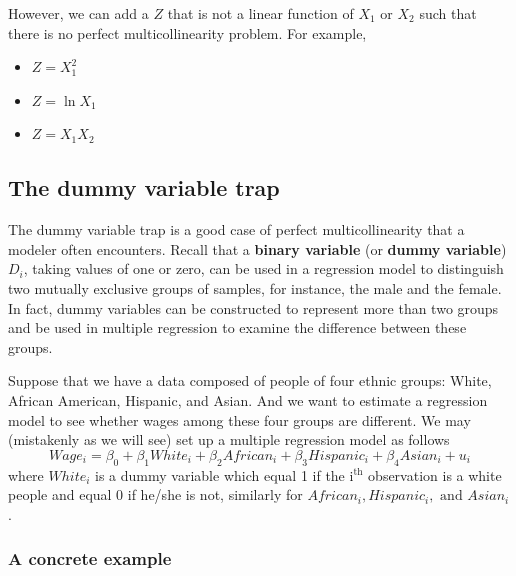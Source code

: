 \documentclass[a4paper,11pt]{article}
\begin{document}
However, we can add a \(Z\) that is not a linear function of \(X_1\) or
\(X_2\) such that there is no perfect multicollinearity problem. For example,
\begin{itemize}
\item \(Z = X_1^2\)
\item \(Z = \ln X_1\)
\item \(Z = X_1 X_2\)
\end{itemize}


\subsection{The dummy variable trap}
\label{sec:org298d2e0}
The dummy variable trap is a good case of perfect multicollinearity
that a modeler often encounters. Recall that a \textbf{binary variable} (or
\textbf{dummy variable}) \(D_i\), taking values of one or zero, can be used in
a regression model to distinguish two mutually exclusive groups of
samples, for instance, the male and the female. In fact, dummy
variables can be constructed to represent more than two groups and be
used in multiple regression to examine the difference between these
groups.

Suppose that we have a data composed of people of four ethnic groups:
White, African American, Hispanic, and Asian. And we want to estimate
a regression model to see whether wages among these four groups are
different. We may (mistakenly as we will see) set up a multiple
regression model as follows
\begin{equation}
\label{eq:dummy-trap}
Wage_i = \beta_0 + \beta_1 White_i + \beta_2 African_i + \beta_3 Hispanic_i + \beta_4 Asian_i + u_i
\end{equation}
where \(White_i\) is a dummy variable which equal 1 if the i\(^{\text{th}}\)
observation is a white people and equal 0 if he/she is not, similarly
for \(African_i, Hispanic_i, \text{ and } Asian_i\).

\subsubsection*{A concrete example}
\label{sec:org6cab43c}
\end{document}
